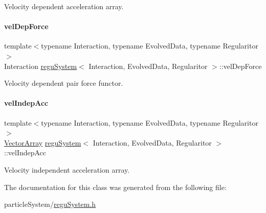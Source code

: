 Velocity dependent acceleration array. 

\mbox{\label{classregu_system_a9361c6c64c946570d6a71e3ab6ba74a0}} 
\paragraph{\texorpdfstring{vel\+Dep\+Force}{velDepForce}}
{\footnotesize\ttfamily template$<$typename Interaction, typename Evolved\+Data, typename Regularitor$>$ \\
Interaction \mbox{\hyperlink{classregu_system}{regu\+System}}$<$ Interaction, Evolved\+Data, Regularitor $>$\+::vel\+Dep\+Force\hspace{0.3cm}{\ttfamily [private]}}



Velocity dependent pair force functor. 

\mbox{\label{classregu_system_afafcbf5f0c994cfe62d9fb8fb51023ab}} 
\paragraph{\texorpdfstring{vel\+Indep\+Acc}{velIndepAcc}}
{\footnotesize\ttfamily template$<$typename Interaction, typename Evolved\+Data, typename Regularitor$>$ \\
\mbox{\hyperlink{classregu_system_aa4ecefb5c437230b994171e231450be8}{Vector\+Array}} \mbox{\hyperlink{classregu_system}{regu\+System}}$<$ Interaction, Evolved\+Data, Regularitor $>$\+::vel\+Indep\+Acc\hspace{0.3cm}{\ttfamily [private]}}



Velocity independent acceleration array. 



The documentation for this class was generated from the following file\+:\begin{DoxyCompactItemize}
\item 
particle\+System/\mbox{\hyperlink{regu_system_8h}{regu\+System.\+h}}\end{DoxyCompactItemize}
